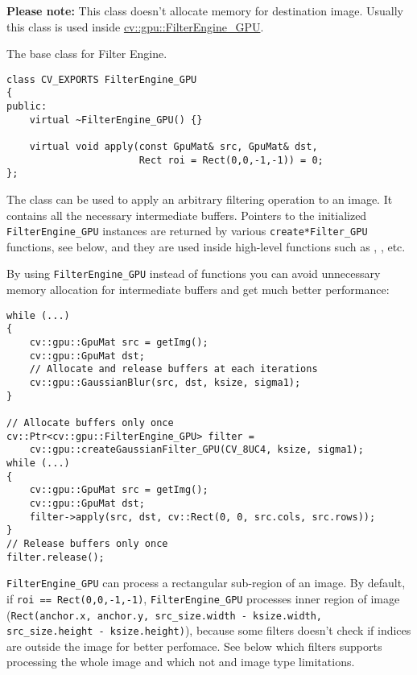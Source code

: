 \textbf{Please note:} This class doesn't allocate memory for destination image. Usually this class is used inside \hyperref[class.gpu.FilterEngine]{cv::gpu::FilterEngine\_GPU}.


\label{class.gpu.FilterEngine}
The base class for Filter Engine.

\begin{lstlisting}
class CV_EXPORTS FilterEngine_GPU
{
public:
    virtual ~FilterEngine_GPU() {}

    virtual void apply(const GpuMat& src, GpuMat& dst, 
                       Rect roi = Rect(0,0,-1,-1)) = 0;
};
\end{lstlisting}

The class can be used to apply an arbitrary filtering operation to an image. It contains all the necessary intermediate buffers. Pointers to the initialized \texttt{FilterEngine\_GPU} instances are returned by various \texttt{create*Filter\_GPU} functions, see below, and they are used inside high-level functions such as , ,  etc.

By using \texttt{FilterEngine\_GPU} instead of functions you can avoid unnecessary memory allocation for intermediate buffers and get much better performance:

\begin{lstlisting}
while (...)
{
    cv::gpu::GpuMat src = getImg();
    cv::gpu::GpuMat dst;
    // Allocate and release buffers at each iterations
    cv::gpu::GaussianBlur(src, dst, ksize, sigma1);
}

// Allocate buffers only once
cv::Ptr<cv::gpu::FilterEngine_GPU> filter = 
    cv::gpu::createGaussianFilter_GPU(CV_8UC4, ksize, sigma1);
while (...)
{
    cv::gpu::GpuMat src = getImg();
    cv::gpu::GpuMat dst;
    filter->apply(src, dst, cv::Rect(0, 0, src.cols, src.rows));
}
// Release buffers only once
filter.release();
\end{lstlisting}

\texttt{FilterEngine\_GPU} can process a rectangular sub-region of an image. By default, if \texttt{roi == Rect(0,0,-1,-1)}, \texttt{FilterEngine\_GPU} processes inner region of image (\texttt{Rect(anchor.x, anchor.y, src\_size.width - ksize.width, src\_size.height - ksize.height)}), because some filters doesn't check if indices are outside the image for better perfomace. See below which filters supports processing the whole image and which not and image type limitations.

